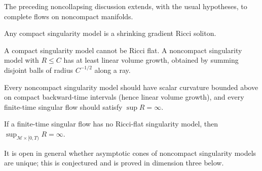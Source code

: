 \begin{remark}
\label{rem:chow-iv-noncompact-extension}
The preceding noncollapsing discussion extends, with the usual hypotheses,
to complete flows on noncompact manifolds.
\end{remark}

\begin{theorem}
\label{thm:chow-iv-compact-singularity-models}
Any compact singularity model is a shrinking gradient Ricci soliton.
\end{theorem}

\begin{remark}
\label{rem:chow-iv-linear-volume-growth}
A compact singularity model cannot be Ricci flat.  A noncompact singularity
model with \(R\le C\) has at least linear volume growth, obtained by summing
disjoint balls of radius \(C^{-1/2}\) along a ray.
\end{remark}

\begin{remark}
\label{rem:chow-iv-singularity-conjectures}
Every noncompact singularity model should have scalar curvature bounded above
on compact backward-time intervals (hence linear volume growth), and every
finite-time singular flow should satisfy \(\sup R=\infty\).
\end{remark}

\begin{lemma}
\label{lem:chow-iv-bounded-scalar-criterion}
If a finite-time singular flow has no Ricci-flat singularity model, then
\(\sup_{\mathcal M\times[0,T)}R=\infty\).
\end{lemma}

\begin{remark}[Problems 28.17--28.18]
\label{rem:chow-iv-asymptotic-cone-problems}
It is open in general whether asymptotic cones of noncompact singularity
models are unique; this is conjectured and is proved in dimension three below.
\end{remark}

